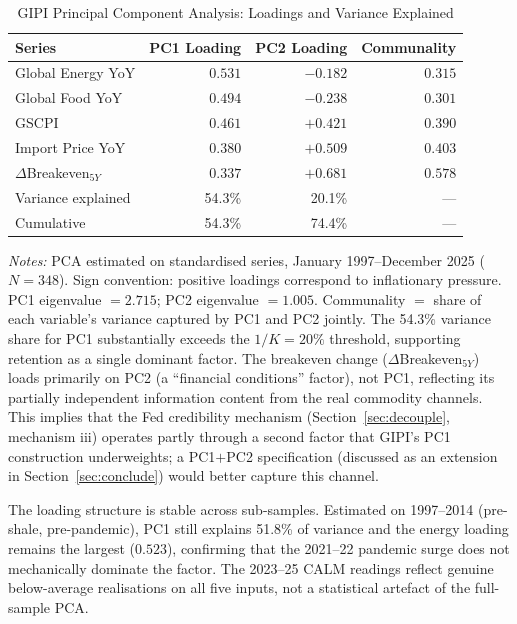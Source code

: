 \documentclass[12pt]{article}
\begin{document}
\begin{table}[htbp]\begin{center}
\caption{GIPI Principal Component Analysis: Loadings and Variance Explained}
\label{tab:pca}
\begin{threeparttable}\small\setlength{\tabcolsep}{8pt}
\begin{tabular}{@{}l r r r@{}}
\toprule
Series & PC1 Loading & PC2 Loading & Communality\\
\midrule
Global Energy YoY       & $0.531$ & $-0.182$ & $0.315$\\
Global Food YoY         & $0.494$ & $-0.238$ & $0.301$\\
GSCPI                   & $0.461$ & $+0.421$ & $0.390$\\
Import Price YoY        & $0.380$ & $+0.509$ & $0.403$\\
$\Delta$Breakeven$_{5Y}$& $0.337$ & $+0.681$ & $0.578$\\
\midrule
Variance explained      & 54.3\%  & 20.1\%   & ---\\
Cumulative              & 54.3\%  & 74.4\%   & ---\\
\bottomrule
\end{tabular}
\begin{tablenotes}[flushleft]\footnotesize
\item \textit{Notes:} PCA estimated on standardised series, January 1997--December 2025
($N=348$). Sign convention: positive loadings correspond to inflationary pressure.
PC1 eigenvalue $= 2.715$; PC2 eigenvalue $= 1.005$.
Communality $=$ share of each variable's variance captured by PC1 and PC2 jointly.
The 54.3\% variance share for PC1 substantially exceeds the $1/K = 20\%$ threshold,
supporting retention as a single dominant factor.
The breakeven change ($\Delta$Breakeven$_{5Y}$) loads primarily on PC2 (a
``financial conditions'' factor), not PC1, reflecting its partially independent
information content from the real commodity channels.
This implies that the Fed credibility mechanism (Section~\ref{sec:decouple},
mechanism iii) operates partly through a second factor that GIPI's PC1
construction underweights; a PC1$+$PC2 specification (discussed as an
extension in Section~\ref{sec:conclude}) would better capture this channel.
\end{tablenotes}
\end{threeparttable}
\end{center}\end{table}

The loading structure is stable across sub-samples.
Estimated on 1997--2014 (pre-shale, pre-pandemic), PC1 still explains 51.8\%
of variance and the energy loading remains the largest ($0.523$), confirming
that the 2021--22 pandemic surge does not mechanically dominate the factor.
The 2023--25 CALM readings reflect genuine below-average realisations on
all five inputs, not a statistical artefact of the full-sample PCA.
\end{document}
